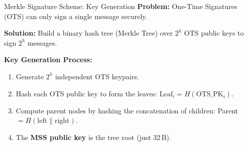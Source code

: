 \documentclass[aspectratio=169, 10pt]{beamer}
\begin{document}
\begin{frame}{Merkle Signature Scheme: Key Generation}
\vspace{4pt}
\textbf{Problem:} One-Time Signatures (OTS) can only sign a single message securely.

\vspace{6pt}
\textbf{Solution:} Build a binary hash tree (Merkle Tree) over \(2^h\) OTS public keys to sign \(2^h\) messages.

\vspace{12pt}
\textbf{Key Generation Process:}
\begin{enumerate}
    \item Generate \(2^h\) independent OTS keypairs.
    \item Hash each OTS public key to form the leaves: \(\text{Leaf}_i = H(\text{OTS\_PK}_i)\).
    \item Compute parent nodes by hashing the concatenation of children: Parent \(= H(\text{left} \| \text{right})\).
    \item The \textbf{MSS public key} is the tree root (just 32\,B).
\end{enumerate}
\end{frame}
\end{document}
